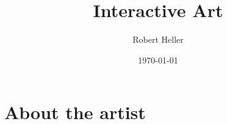 \documentclass[12pt]{article}
\title{Interactive Art}
\author{Robert Heller}
\date{\today}
\begin{document}
\maketitle

\tableofcontents

\section*{About the artist}









%
\end{document}
